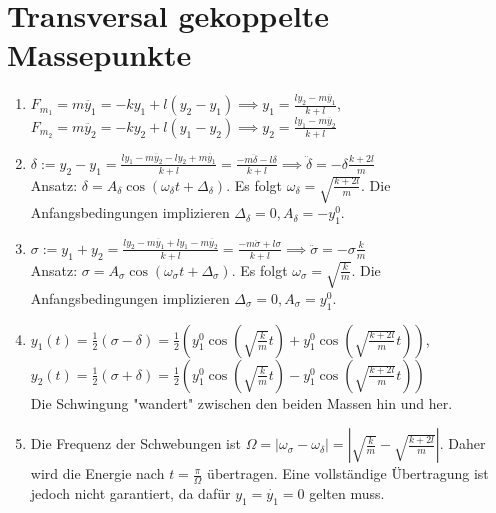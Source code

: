 \documentclass{article}
\begin{document}
\section{Transversal gekoppelte Massepunkte}
\begin{enumerate}[label=\alph*)]
    \item $F_{m_1} = m \ddot{y_1} = -ky_1 + l(y_2 - y_1) \implies y_1 = \frac{ly_2  - m \ddot{y_1}}{k + l}$, \\
    $F_{m_2} = m \ddot{y_2} = -ky_2 + l(y_1 - y_2) \implies y_2 = \frac{ly_1 - m \ddot{y_2}}{k + l}$ \\
    
    \item $\delta := y_2 - y_1 = \frac{ly_1 - m \ddot{y_2} - ly_2 + m \ddot{y_1}}{k + l}
    = \frac{- m \ddot{\delta} - l\delta}{k + l} 
    \implies \ddot{\delta} = - \delta \frac{k + 2l}{m}$ \\ 

    Ansatz: $\delta = A_{\delta} \cos(\omega_{\delta} t + \Delta_{\delta})$. 
    Es folgt $\omega_{\delta} = \sqrt{\frac{k + 2l}{m}}$. 
    Die Anfangsbedingungen implizieren $\Delta_{\delta} = 0, A_{\delta} = -y_1^0$.
    
    \item $\sigma := y_1 + y_2 = \frac{ly_2  - m \ddot{y_1} + ly_1 - m \ddot{y_2}}{k + l}
    = \frac{- m\ddot{\sigma} + l \sigma}{k + l} \implies \ddot{\sigma} = -\sigma \frac{k}{m}$ \\

    Ansatz: $\sigma = A_{\sigma} \cos(\omega_{\sigma} t + \Delta_{\sigma})$. 
    Es folgt $\omega_{\sigma} = \sqrt{\frac{k}{m}}$. 
    Die Anfangsbedingungen implizieren $\Delta_{\sigma} = 0, A_{\sigma} = y_1^0$.
    
    \item $y_1(t) = \frac12 (\sigma - \delta) 
    = \frac12 \left(y_1^0 \cos\left(\sqrt{\frac{k}{m}} t\right) + y_1^0 \cos\left(\sqrt{\frac{k + 2l}{m}} t\right)\right)$, \\
    $y_2(t) = \frac12 (\sigma + \delta)
    = \frac12 \left(y_1^0 \cos\left(\sqrt{\frac{k}{m}} t\right) - y_1^0 \cos\left(\sqrt{\frac{k + 2l}{m}} t\right)\right)$ \\
    \vspace{0.5em}
    Die Schwingung "wandert" zwischen den beiden Massen hin und her.

    \item Die Frequenz der Schwebungen ist $\Omega = \left|\omega_{\sigma} - \omega_{\delta}\right| = \left|\sqrt{\frac{k}{m}} - \sqrt{\frac{k + 2l}{m}}\right|$. Daher wird die Energie nach $t = \frac{\pi}{\Omega}$ übertragen. Eine vollständige Übertragung ist jedoch nicht garantiert, da dafür $y_1 = \dot{y_1} = 0$ gelten muss. 
\end{enumerate}
\end{document}
